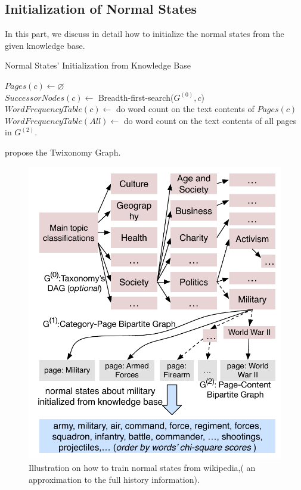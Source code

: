 \documentclass[conference,compsoc]{IEEEtran}
\begin{document}
\subsection{Initialization of Normal States}
In this part, we discuss in detail how to initialize the normal states from the given knowledge base. 
\begin{algorithm}
\caption{Normal States' Initialization from Knowledge Base}
\label{alg:normalStatesInit}

\(Pages(c)\leftarrow \varnothing\)\\
\(SuccessorNodes(c) \leftarrow \) Breadth-first-search(\(G^{(0)},c\))\\
\(WordFrequencyTable(c) \leftarrow \) do word count on the text contents of \(Pages(c)\) \\
\(WordFrequencyTable(All) \leftarrow \) do word count on the text contents of all pages in \(G^{(2)}\).\\
\end{algorithm}

\cite{faralli2015large} propose the Twixonomy Graph. 


\begin{figure}
    \centering
    \includegraphics[width=.85\columnwidth]{img/initializationExample.pdf}  
    \caption{Illustration on how to train normal states from wikipedia,( an approximation to the full history information).}
    \label{fig:modelDesc}
\end{figure}
\end{document}
